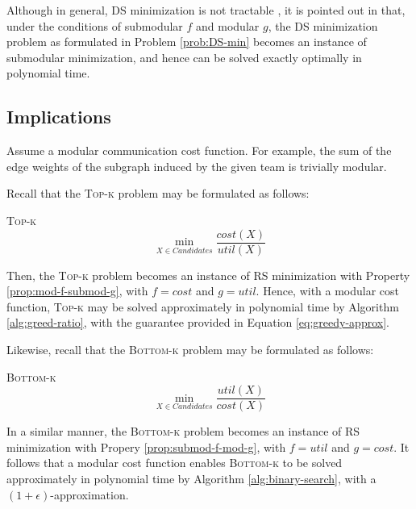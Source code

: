 

Although in general, DS minimization is not tractable \cite{iyer2012algorithms}, it is pointed out in \cite{bai2016algorithms} that, under the conditions of submodular $ f $ and modular $ g $, the DS minimization problem as formulated in Problem \ref{prob:DS-min} becomes an instance of submodular minimization, and hence can be solved exactly optimally in polynomial time.

\subsection*{Implications}

Assume a modular communication cost function.
For example, the sum of the edge weights of the subgraph induced by the given team is trivially modular.

Recall that the \textsc{Top-k} problem may be formulated as follows:
\begin{problem}
	\label{prob:top-k}
	\textsc{Top-k}
	$$ \underset{X \in Candidates}{\min} \frac{cost(X)}{util(X)} $$
\end{problem}
Then, the \textsc{Top-k} problem becomes an instance of RS minimization with Property \ref{prop:mod-f-submod-g}, with $ f = cost $ and $ g = util $.
Hence, with a modular cost function, \textsc{Top-k} may be solved approximately in polynomial time by Algorithm \ref{alg:greed-ratio}, with the guarantee provided in Equation \ref{eq:greedy-approx}.

Likewise, recall that the \textsc{Bottom-k} problem may be formulated as follows:
\begin{problem}
	\label{prob:bottom-k}
	\textsc{Bottom-k}
	\[ \underset{X \in Candidates}{\min} \frac{util(X)}{cost(X)}
	\]
\end{problem}
In a similar manner, the \textsc{Bottom-k} problem becomes an instance of RS minimization with Propery \ref{prop:submod-f-mod-g}, with $ f = util $ and $ g = cost $.
It follows that a modular cost function enables \textsc{Bottom-k} to be solved approximately in polynomial time by Algorithm \ref{alg:binary-search}, with a $ (1+\epsilon) $-approximation.
